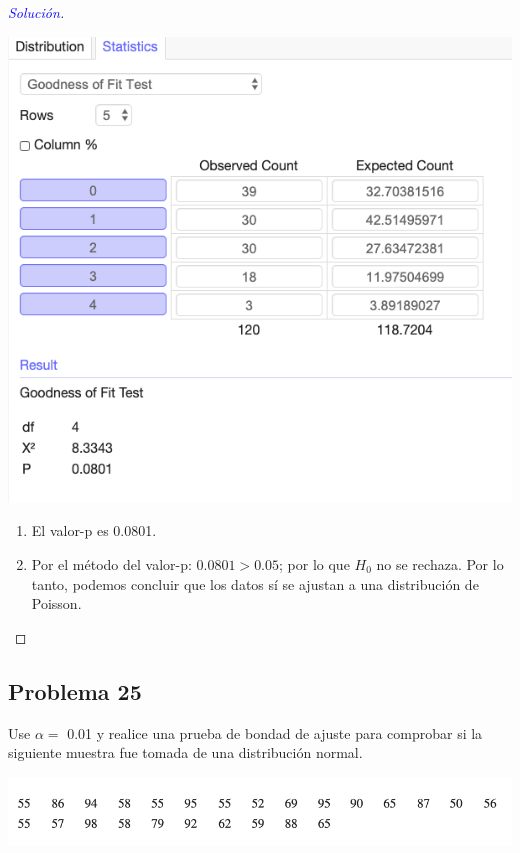 \documentclass[a4paper,12pt]{article}
\newenvironment{solution}
  {\renewcommand\qedsymbol{$\square$}\begin{proof}[\textcolor{blue}{Solución}]}
  {\end{proof}}
\begin{document}
\begin{solution}
\begin{center}
    \includegraphics[scale=0.45]{images/Screen Shot 2021-05-11 at 11.49.48.png}
\end{center}

\begin{enumerate}
    \item El valor-p es 0.0801. 
    \item Por el método del valor-p: $0.0801>0.05$; por lo que $H_0$ no se rechaza. Por lo tanto, podemos concluir que los datos sí se ajustan a una distribución de Poisson.
\end{enumerate}
\end{solution}




\subsection{Problema 25} 

Use $\alpha=$ 0.01 y realice una prueba de bondad de ajuste para comprobar si la siguiente muestra fue tomada de una distribución normal.

\begin{center}
    \includegraphics[scale=0.45]{images/Screen Shot 2021-05-11 at 11.56.58.png}
\end{center}
\end{document}
